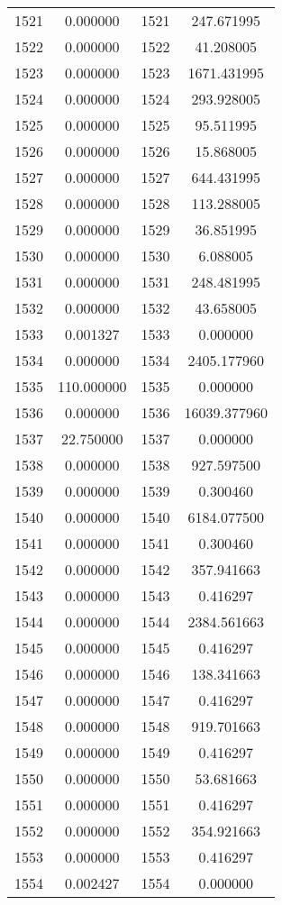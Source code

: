 \documentclass[12pt]{article}
\begin{document}
\begin{longtable}{@{}cccc@{}}
1521 & 0.000000 & 1521 & 247.671995 \\
1522 & 0.000000 & 1522 & 41.208005 \\
1523 & 0.000000 & 1523 & 1671.431995 \\
1524 & 0.000000 & 1524 & 293.928005 \\
1525 & 0.000000 & 1525 & 95.511995 \\
1526 & 0.000000 & 1526 & 15.868005 \\
1527 & 0.000000 & 1527 & 644.431995 \\
1528 & 0.000000 & 1528 & 113.288005 \\
1529 & 0.000000 & 1529 & 36.851995 \\
1530 & 0.000000 & 1530 & 6.088005 \\
1531 & 0.000000 & 1531 & 248.481995 \\
1532 & 0.000000 & 1532 & 43.658005 \\
1533 & 0.001327 & 1533 & 0.000000 \\
1534 & 0.000000 & 1534 & 2405.177960 \\
1535 & 110.000000 & 1535 & 0.000000 \\
1536 & 0.000000 & 1536 & 16039.377960 \\
1537 & 22.750000 & 1537 & 0.000000 \\
1538 & 0.000000 & 1538 & 927.597500 \\
1539 & 0.000000 & 1539 & 0.300460 \\
1540 & 0.000000 & 1540 & 6184.077500 \\
1541 & 0.000000 & 1541 & 0.300460 \\
1542 & 0.000000 & 1542 & 357.941663 \\
1543 & 0.000000 & 1543 & 0.416297 \\
1544 & 0.000000 & 1544 & 2384.561663 \\
1545 & 0.000000 & 1545 & 0.416297 \\
1546 & 0.000000 & 1546 & 138.341663 \\
1547 & 0.000000 & 1547 & 0.416297 \\
1548 & 0.000000 & 1548 & 919.701663 \\
1549 & 0.000000 & 1549 & 0.416297 \\
1550 & 0.000000 & 1550 & 53.681663 \\
1551 & 0.000000 & 1551 & 0.416297 \\
1552 & 0.000000 & 1552 & 354.921663 \\
1553 & 0.000000 & 1553 & 0.416297 \\
1554 & 0.002427 & 1554 & 0.000000 \\

\end{longtable}
\end{document}
